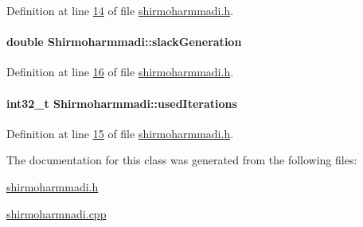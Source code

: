 Definition at line \hyperlink{shirmoharmmadi_8h_source_l00014}{14} of file \hyperlink{shirmoharmmadi_8h_source}{shirmoharmmadi.\+h}.

\hypertarget{class_shirmoharmmadi_aeb47da6439c2e92c7ebcc59ebb71624b}{}
\paragraph[{slack\+Generation}]{\setlength{\rightskip}{0pt plus 5cm}double Shirmoharmmadi\+::slack\+Generation}\label{class_shirmoharmmadi_aeb47da6439c2e92c7ebcc59ebb71624b}


Definition at line \hyperlink{shirmoharmmadi_8h_source_l00016}{16} of file \hyperlink{shirmoharmmadi_8h_source}{shirmoharmmadi.\+h}.

\hypertarget{class_shirmoharmmadi_afdd22da0145b033c47f4f8a6bbd37d0d}{}
\paragraph[{used\+Iterations}]{\setlength{\rightskip}{0pt plus 5cm}int32\+\_\+t Shirmoharmmadi\+::used\+Iterations}\label{class_shirmoharmmadi_afdd22da0145b033c47f4f8a6bbd37d0d}


Definition at line \hyperlink{shirmoharmmadi_8h_source_l00015}{15} of file \hyperlink{shirmoharmmadi_8h_source}{shirmoharmmadi.\+h}.



The documentation for this class was generated from the following files\+:\begin{DoxyCompactItemize}
\item 
\hyperlink{shirmoharmmadi_8h}{shirmoharmmadi.\+h}\item 
\hyperlink{shirmoharmnadi_8cpp}{shirmoharmnadi.\+cpp}\end{DoxyCompactItemize}
